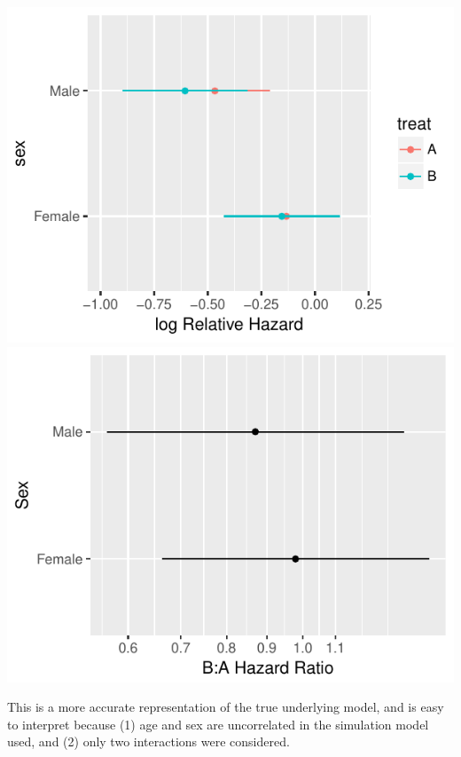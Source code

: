 \centerline{\includegraphics{ancova-htejoint-1} \includegraphics{ancova-htejoint-2} }


This is a more accurate representation of the true underlying model, and is easy to interpret because (1) age and sex are uncorrelated in the simulation model used, and (2) only two interactions were considered. 

